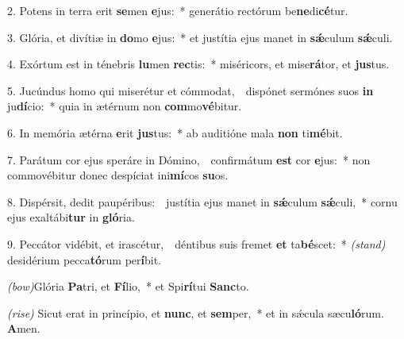 2. Potens in terra erit \textbf{se}men \textbf{e}jus:~*
	generátio rectórum be\textbf{ne}di\textbf{cé}tur.

3. Glória, et divítiæ in \textbf{do}mo \textbf{e}jus:~*
	et justítia ejus manet in \textbf{s\'{\ae}}culum \textbf{s\'{\ae}}culi.

4. Exórtum est in ténebris \textbf{lu}men \textbf{rec}tis:~*
	miséricors, et mise\textbf{rá}tor, et \textbf{jus}tus.

5. Jucúndus homo qui miserétur et cómmodat,~\GreDagger\
	dispónet sermónes suos \textbf{in} ju\textbf{dí}cio:~*
	quia in ætérnum non \textbf{com}mo\textbf{vé}bitur.

6. In memória ætérna \textbf{e}rit \textbf{jus}tus:~*
	ab auditióne mala \textbf{non} ti\textbf{mé}bit.

7. Parátum cor ejus speráre in Dómino,~\GreDagger\
	confirmátum \textbf{est} cor \textbf{e}jus:~*
	non commovébitur donec despíciat ini\textbf{mí}cos \textbf{su}os.

8. Dispérsit, dedit paupéribus:~\GreDagger\
	justítia ejus manet in \textbf{s\'{\ae}}culum \textbf{s\'{\ae}}\-culi,~*
	cornu ejus exaltábi\textbf{tur} in \textbf{gló}ria.

9. Peccátor vidébit, et irascétur,~\GreDagger\
	déntibus suis fremet \textbf{et} ta\textbf{bé}scet:~* {\color{red}\textit{(stand)}}
	desidérium pecca\textbf{tó}rum per\textbf{í}bit.

{\color{red}\textit{(bow)}}Glória \textbf{Pa}tri, et \textbf{Fí}lio,~*
	et Spi\textbf{rí}tui \textbf{Sanc}to.

{\color{red}\textit{(rise)}} Sicut erat in princípio, et \textbf{nunc}, et \textbf{sem}per,~*
	et in s\'{\ae}cula sæcu\textbf{ló}rum. \textbf{A}men.